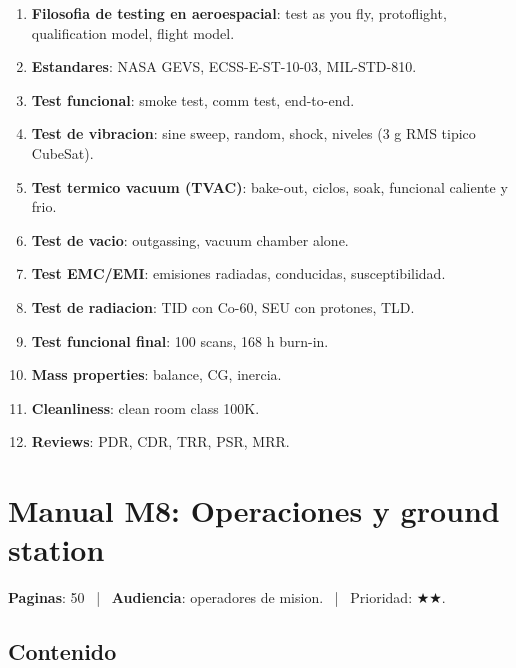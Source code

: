 \documentclass[11pt,a4paper,oneside]{report}
\begin{document}
\begin{enumerate}[leftmargin=2em]
  \item \textbf{Filosofia de testing en aeroespacial}: test as you fly,
        protoflight, qualification model, flight model.
  \item \textbf{Estandares}: NASA GEVS, ECSS-E-ST-10-03, MIL-STD-810.
  \item \textbf{Test funcional}: smoke test, comm test, end-to-end.
  \item \textbf{Test de vibracion}: sine sweep, random, shock,
        niveles (3 g RMS tipico CubeSat).
  \item \textbf{Test termico vacuum (TVAC)}: bake-out, ciclos, soak,
        funcional caliente y frio.
  \item \textbf{Test de vacio}: outgassing, vacuum chamber alone.
  \item \textbf{Test EMC/EMI}: emisiones radiadas, conducidas,
        susceptibilidad.
  \item \textbf{Test de radiacion}: TID con Co-60, SEU con protones, TLD.
  \item \textbf{Test funcional final}: 100 scans, 168 h burn-in.
  \item \textbf{Mass properties}: balance, CG, inercia.
  \item \textbf{Cleanliness}: clean room class 100K.
  \item \textbf{Reviews}: PDR, CDR, TRR, PSR, MRR.
\end{enumerate}

\chapter{Manual M8: Operaciones y ground station}

\textbf{Paginas}: 50 ~|~ \textbf{Audiencia}: operadores de mision.
~|~ Prioridad: $\bigstar\bigstar$.

\section{Contenido}
\end{document}
